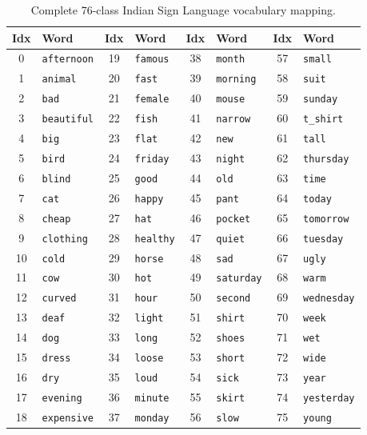 \begin{table}[htbp]
\centering
\caption{Complete 76-class Indian Sign Language vocabulary mapping.}
\label{tab:verified_classes}
\tiny
\setlength{\tabcolsep}{3pt}
\renewcommand{\arraystretch}{0.92}
\begin{tabularx}{\textwidth}{c l c l c l c l}
\toprule
\textbf{Idx} & \textbf{Word} & \textbf{Idx} & \textbf{Word} & \textbf{Idx} & \textbf{Word} & \textbf{Idx} & \textbf{Word} \\
\midrule
0 & \texttt{afternoon} & 19 & \texttt{famous} & 38 & \texttt{month} & 57 & \texttt{small} \\
1 & \texttt{animal} & 20 & \texttt{fast} & 39 & \texttt{morning} & 58 & \texttt{suit} \\
2 & \texttt{bad} & 21 & \texttt{female} & 40 & \texttt{mouse} & 59 & \texttt{sunday} \\
3 & \texttt{beautiful} & 22 & \texttt{fish} & 41 & \texttt{narrow} & 60 & \texttt{t\_shirt} \\
4 & \texttt{big} & 23 & \texttt{flat} & 42 & \texttt{new} & 61 & \texttt{tall} \\
5 & \texttt{bird} & 24 & \texttt{friday} & 43 & \texttt{night} & 62 & \texttt{thursday} \\
6 & \texttt{blind} & 25 & \texttt{good} & 44 & \texttt{old} & 63 & \texttt{time} \\
7 & \texttt{cat} & 26 & \texttt{happy} & 45 & \texttt{pant} & 64 & \texttt{today} \\
8 & \texttt{cheap} & 27 & \texttt{hat} & 46 & \texttt{pocket} & 65 & \texttt{tomorrow} \\
9 & \texttt{clothing} & 28 & \texttt{healthy} & 47 & \texttt{quiet} & 66 & \texttt{tuesday} \\
10 & \texttt{cold} & 29 & \texttt{horse} & 48 & \texttt{sad} & 67 & \texttt{ugly} \\
11 & \texttt{cow} & 30 & \texttt{hot} & 49 & \texttt{saturday} & 68 & \texttt{warm} \\
12 & \texttt{curved} & 31 & \texttt{hour} & 50 & \texttt{second} & 69 & \texttt{wednesday} \\
13 & \texttt{deaf} & 32 & \texttt{light} & 51 & \texttt{shirt} & 70 & \texttt{week} \\
14 & \texttt{dog} & 33 & \texttt{long} & 52 & \texttt{shoes} & 71 & \texttt{wet} \\
15 & \texttt{dress} & 34 & \texttt{loose} & 53 & \texttt{short} & 72 & \texttt{wide} \\
16 & \texttt{dry} & 35 & \texttt{loud} & 54 & \texttt{sick} & 73 & \texttt{year} \\
17 & \texttt{evening} & 36 & \texttt{minute} & 55 & \texttt{skirt} & 74 & \texttt{yesterday} \\
18 & \texttt{expensive} & 37 & \texttt{monday} & 56 & \texttt{slow} & 75 & \texttt{young} \\
\bottomrule
\end{tabularx}
\end{table}

